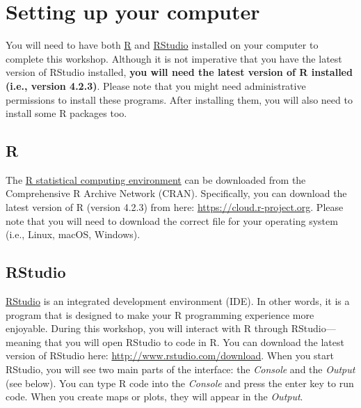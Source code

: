 \documentclass[
  12pt,
]{book}
\begin{document}
\hypertarget{setup}{%
\section{Setting up your computer}\label{setup}}

You will need to have both \href{https://www.r-project.org}{R} and \href{https://www.rstudio.com/}{RStudio} installed on your computer to complete this workshop. Although it is not imperative that you have the latest version of RStudio installed, \textbf{you will need the latest version of R installed (i.e., version 4.2.3)}. Please note that you might need administrative permissions to install these programs. After installing them, you will also need to install some R packages too.

\clearpage

\hypertarget{r}{%
\subsection{R}\label{r}}

The \href{https://www.r-project.org}{R statistical computing environment} can be downloaded from the Comprehensive R Archive Network (CRAN). Specifically, you can download the latest version of R (version 4.2.3) from here: \url{https://cloud.r-project.org}. Please note that you will need to download the correct file for your operating system (i.e., Linux, macOS, Windows).

\hypertarget{rstudio}{%
\subsection{RStudio}\label{rstudio}}

\href{https://www.rstudio.com}{RStudio} is an integrated development environment (IDE). In other words, it is a program that is designed to make your R programming experience more enjoyable. During this workshop, you will interact with R through RStudio---meaning that you will open RStudio to code in R. You can download the latest version of RStudio here: \url{http://www.rstudio.com/download}. When you start RStudio, you will see two main parts of the interface: the \emph{Console} and the \emph{Output} (see below). You can type R code into the \emph{Console} and press the enter key to run code. When you create maps or plots, they will appear in the \emph{Output}.
\end{document}
